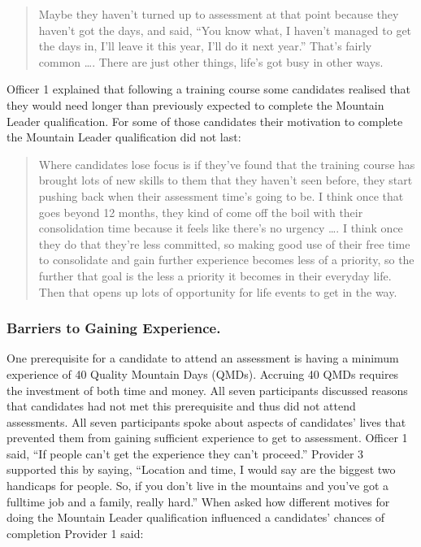 \documentclass[
  12pt,
  a4paper,
]{book}
\begin{document}
\begin{quote}
Maybe they haven't turned up to assessment at that point because they haven't got the days, and said, ``You know what, I haven't managed to get the days in, I'll leave it this year, I'll do it next year.'' That's fairly common \ldots. There are just other things, life's got busy in other ways.
\end{quote}

Officer 1 explained that following a training course some candidates realised that they would need longer than previously expected to complete the Mountain Leader qualification. For some of those candidates their motivation to complete the Mountain Leader qualification did not last:

\begin{quote}
Where candidates lose focus is if they've found that the training course has brought lots of new skills to them that they haven't seen before, they start pushing back when their assessment time's going to be. I think once that goes beyond 12 months, they kind of come off the boil with their consolidation time because it feels like there's no urgency \ldots. I think once they do that they're less committed, so making good use of their free time to consolidate and gain further experience becomes less of a priority, so the further that goal is the less a priority it becomes in their everyday life. Then that opens up lots of opportunity for life events to get in the way.
\end{quote}

\hypertarget{qual-gta-gaining-experience}{%
\subsubsection{Barriers to Gaining Experience.}\label{qual-gta-gaining-experience}}

One prerequisite for a candidate to attend an assessment is having a minimum experience of 40 Quality Mountain Days (QMDs). Accruing 40 QMDs requires the investment of both time and money. All seven participants discussed reasons that candidates had not met this prerequisite and thus did not attend assessments. All seven participants spoke about aspects of candidates' lives that prevented them from gaining sufficient experience to get to assessment. Officer 1 said, ``If people can't get the experience they can't proceed.'' Provider 3 supported this by saying, ``Location and time, I would say are the biggest two handicaps for people. So, if you don't live in the mountains and you've got a fulltime job and a family, really hard.'' When asked how different motives for doing the Mountain Leader qualification influenced a candidates' chances of completion Provider 1 said:
\end{document}
